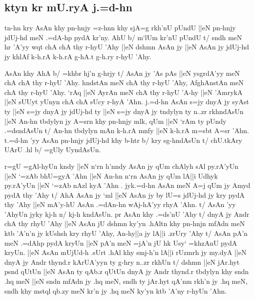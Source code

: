 \documentclass[a4paper,11pt]{article}
\begin{document}
\pushocplist\SindhiOCP
\subsection{ktyn kr mU.ryA j.=d-hn}


tn-hn kry AsAn khy pn-hnjy =z-hnn khy sjA=g rkh'nU pUndU ||eN pn-hnjy
jdUj-hd meN .=dA-hp pydA kr'ny. AhU b/ m`lUm kr'nU pUndU t/ sndh meN
hr 'A'yy wqt chA chA thy r-hyU 'Ahy ||eN dshmn AsAn jy ||eN AsAn jy
jdUj-hd jy khlAf k-h.rA k-h.rA g-hA.t g-h.ry r-hyU 'Ahy.


AsAn khy AhA b/ =khbr hj'n g-hrjy t/ AsAn jy 'As pAs ||eN ysgrdA'yy
meN chA chA thy r-hyU 'Ahy. hndstAn meN chA thy r-hyU 'Ahy, AfghAnstAn
meN chA thy r-hyU 'Ahy. `rAq ||eN AyrAn meN chA thy r-hyU 'A-hy ||eN
'AmrykA ||eN sUUyt yUnyn chA chA sUcy r-hyA 'Ahn. j.=d-hn AsAn s=jy
dnyA jy syAst ty ||eN s=jy dnyA jy jdUj-hd ty ||eN s=jy dnyA jy
tndylyn ty n..zr rkhndAsUn ||eN An-hn tbdylyn jy A=srn khy pn-hnjy
mlk, qUm ||eN `rAm ty pUndy .=dsndAsUn t/ An-hn tbdylyn mAn k-h.rA
mnfy ||eN k-h.rA m=sbt A=sr 'Ahn. t.=d-hn 'yy AsAn pn-hnjy jdUj-hd khy
b-htr b/ kry sg-hndAsUn t/ chU.tkAry UArU .hl b/ =gUly UyndAsUn.


r=gU =gAl-hyUn kndy ||eN n`rn h'nndy AsAn jy qUm chAlyh sAl py.rA'yUn
||eN `=zAb bhU=gyA 'Ahn ||eN An-hn n`rn AsAn jy qUm lA||i Udhyk
py.rA'yUn ||eN `=zAb nAzl kyA 'Ahn . jyk.=d-hn AsAn meN A=j qUm jy
Amyd pydA thy 'Ahy t/ AhA AsAn jy `ml ||eN AsAn jy by lU=s jdUj-hd jy
kry pydA thy 'Ahy ||eN mA'y-hU AsAn .=dAn-hn wAj-hA'yy rhyA 'Ahn. t/
AsAn 'yy 'AhyUn jyky kj-h n/ kj-h kndAsUn. pr AsAn khy .=ds'nU 'Ahy t/
dnyA jy Andr chA thy rhyU {}'Ahy ||eN AsAn jU dshmn ky'yn .hAltn khy
pn-hnjn mfAdn meN ktb 'A'n'n jy kUshsh kry rhyU 'Ahy, An-hy||a jy
lA||i .zrUry 'Ahy t/ AsAn pA'n meN .=dAhp pydA kryUn ||eN pA'n meN
=jA'n jU hk Usy` =khzAnU pydA kryUn. ||eN AsAn mUjUd-h .sUrt .hAl khy
smj-h'n lA||i rUzmrh jy my.dyA ||eN dnyA jy Andr thynd.r kArUA'yyn ty
g-hry n..zr rkhUn t/ dshmn ||eN jAr.hyt psnd qUtUn ||eN AsAn ty qAb.z
qUtUn dnyA jy Andr thynd.r tbdylyn khy sndn .hq meN ||eN sndn mfAdn jy
.hq meN, sndh ty jAr.hyt qA'nm rkh'n jy .hq meN, sndh khy mstql qb.zy
meN kr'n jy .hq meN ky'yn ktb 'A'ny r-hyUn 'Ahn.


\popocplist
\end{document}
